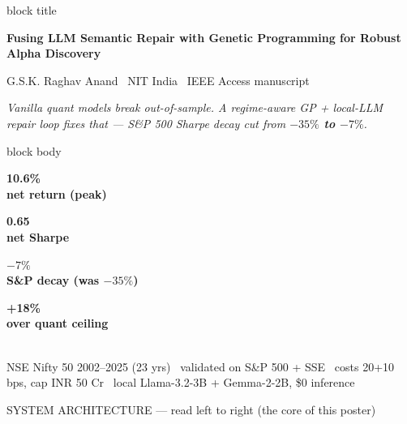 \documentclass[final]{beamer}
\newcommand{\kpi}[3]{%
  \begin{minipage}[t]{0.235\linewidth}\centering
    {\color{#3}\fontsize{30}{30}\selectfont\bfseries #1}\\[0.08cm]
    {\small\bfseries #2}%
  \end{minipage}%
}
\begin{document}
\begin{frame}[t]
\begin{beamercolorbox}[wd=\textwidth,leftskip=1.2cm,rightskip=1.2cm,sep=0.55cm]{block title}
\centering
{\fontsize{44}{46}\selectfont\bfseries Fusing LLM Semantic Repair with Genetic Programming for Robust Alpha Discovery\par}
\vspace{0.25cm}
{\Large G.S.K. Raghav Anand \textbullet\ NIT India \textbullet\ IEEE Access manuscript\par}
\vspace{0.2cm}
{\large\itshape Vanilla quant models break out-of-sample. A regime-aware GP + local-LLM repair loop fixes that --- S\&P 500 Sharpe decay cut from \textbf{$-35\%$ to $-7\%$}.}
\end{beamercolorbox}
\vskip0.3cm
\begin{beamercolorbox}[wd=\textwidth,leftskip=0.8cm,rightskip=0.8cm,sep=0.35cm]{block body}
\centering
\kpi{10.6\%}{net return (peak)}{good}\hfill
\kpi{0.65}{net Sharpe}{navy2}\hfill
\kpi{$-7\%$}{S\&P decay (was $-35\%$)}{good}\hfill
\kpi{+18\%}{over quant ceiling}{accent2}\\[0.1cm]
{\small NSE Nifty 50 2002--2025 (23 yrs) \textbullet\ validated on S\&P 500 + SSE \textbullet\ costs 20+10 bps, cap INR 50 Cr \textbullet\ local Llama-3.2-3B + Gemma-2-2B, \$0 inference}
\end{beamercolorbox}
\vskip0.2cm
\begin{block}{SYSTEM ARCHITECTURE --- read left to right (the core of this poster)}
\centering
{}
\end{block}
\end{frame}
\end{document}
